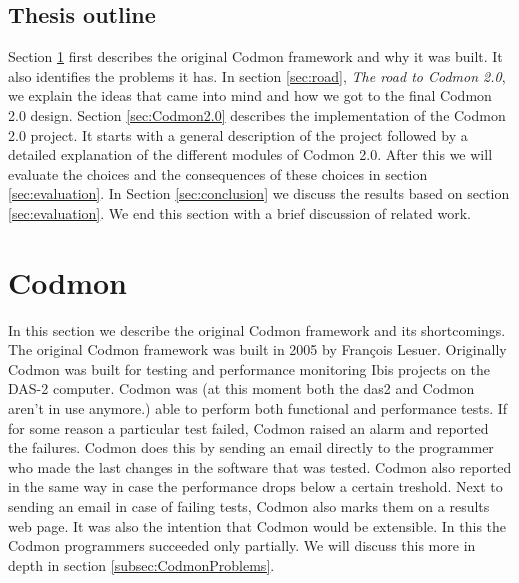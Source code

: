 \documentclass[a4paper,10pt]{scrartcl}
\newcommand{\project}{Codmon 2.0}
\begin{document}
\subsection{Thesis outline}
\label{subsec:Thesisoutline}
Section \ref{sec:codmon} first describes the original Codmon framework and why it was built. It also identifies the problems it has. In section \ref{sec:road}, \emph{The road to \project{}}, 
we explain the ideas that came into mind and how we got to the final \project{} design. Section \ref{sec:Codmon2.0} describes the implementation of the \project{} project. 
It starts with a general description of the project followed by a detailed explanation of the different modules of \project{}. After this we will evaluate the choices and the consequences of these 
choices in section \ref{sec:evaluation}. In Section \ref{sec:conclusion} we discuss the results based on section \ref{sec:evaluation}. We end this section with a brief discussion of related work.

\newpage

\section{Codmon}
\label{sec:codmon}
In this section we describe the original Codmon framework and its shortcomings. The original Codmon framework was built in 2005 by François Lesuer\cite{Codmon}. Originally Codmon was built for 
testing and performance monitoring Ibis projects\cite{Ibis}\cite{Satin}\cite{MPJ}\cite{IPL}\cite{GMI} on the DAS-2\cite{das2} computer. Codmon was (at this moment both the das2 and Codmon aren't 
in use anymore.) able to perform both functional and performance tests. If for some reason a particular test failed, Codmon raised an alarm and reported the failures. Codmon does this by sending an 
email directly to the programmer who made the last changes in the software that was tested. Codmon also reported in the same way in case the performance drops below a certain treshold. Next to 
sending an email in case of failing tests, Codmon also marks them on a results web page. It was also the intention that Codmon would be extensible. In this the Codmon programmers succeeded only partially. We will discuss this more in depth in section \ref{subsec:CodmonProblems}.  
\end{document}
